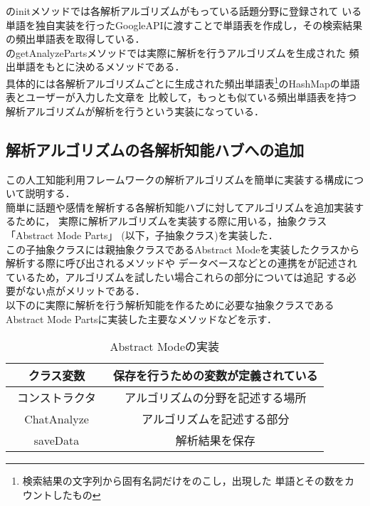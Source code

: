 のinitメソッドでは各解析アルゴリズムがもっている話題分野に登録されて
いる単語を独自実装を行ったGoogleAPIに渡すことで単語表を作成し，その検索結果の頻出単語表を取得している．
\\
のgetAnalyzePartsメソッドでは実際に解析を行うアルゴリズムを生成された
頻出単語をもとに決めるメソッドである．
\\
具体的には各解析アルゴリズムごとに生成された頻出単語表\footnote{検索結果の文字列から固有名詞だけをのこし，出現した
単語とその数をカウントしたもの}のHashMapの単語表とユーザーが入力した文章を
比較して，もっとも似ている頻出単語表を持つ解析アルゴリズムが解析を行うという実装になっている．
\\




\subsection{解析アルゴリズムの各解析知能ハブへの追加}
この人工知能利用フレームワークの解析アルゴリズムを簡単に実装する構成について説明する．\\

簡単に話題や感情を解析する各解析知能ハブに対してアルゴリズムを追加実装するために，
実際に解析アルゴリズムを実装する際に用いる，抽象クラス「Abstract Mode Parts」
(以下，子抽象クラス)を実装した．\\

この子抽象クラスには親抽象クラスであるAbstract Modeを実装したクラスから解析する際に呼び出されるメソッドや
データベースなどとの連携をが記述されているため，アルゴリズムを試したい場合これらの部分については追記
する必要がない点がメリットである．\\

以下のに実際に解析を行う解析知能を作るために必要な抽象クラスである
Abstract Mode Partsに実装した主要なメソッドなどを示す．
\begin{table}[tbh]
	\caption{Abstract Modeの実装} \label{tab:Abstract Mode Parts}
	\begin{center}
		\begin{tabular}[htb]{c|c}
		\hline
		クラス変数 & 保存を行うための変数が定義されている \\ \hline
		コンストラクタ　& アルゴリズムの分野を記述する場所 \\ \hline
		ChatAnalyze & アルゴリズムを記述する部分 \\ \hline
		saveData & 解析結果を保存 \\ \hline
		\end{tabular}
	\end{center}
\end{table}

